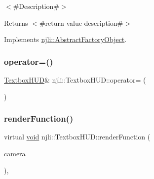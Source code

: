 $<$\#\+Description\#$>$

\begin{DoxyReturn}{Returns}
$<$\#return value description\#$>$ 
\end{DoxyReturn}


Implements \mbox{\hyperlink{classnjli_1_1_abstract_factory_object_a838f4fa7e65cace6098aab5222892942}{njli\+::\+Abstract\+Factory\+Object}}.

\mbox{\label{classnjli_1_1_textbox_h_u_d_a9d253eccffd7f570e70c436ebb823e14}} 
\subsubsection{\texorpdfstring{operator=()}{operator=()}}
{\footnotesize\ttfamily \mbox{\hyperlink{classnjli_1_1_textbox_h_u_d}{Textbox\+H\+UD}}\& njli\+::\+Textbox\+H\+U\+D\+::operator= (\begin{DoxyParamCaption}\item[{const \mbox{\hyperlink{classnjli_1_1_textbox_h_u_d}{Textbox\+H\+UD}} \&}]{ }\end{DoxyParamCaption})\hspace{0.3cm}{\ttfamily [protected]}}

\mbox{\label{classnjli_1_1_textbox_h_u_d_a6daa89a33de35e6cf85b56970447a3a8}} 
\subsubsection{\texorpdfstring{render\+Function()}{renderFunction()}}
{\footnotesize\ttfamily virtual \mbox{\hyperlink{_thread_8h_af1e856da2e658414cb2456cb6f7ebc66}{void}} njli\+::\+Textbox\+H\+U\+D\+::render\+Function (\begin{DoxyParamCaption}\item[{\mbox{\hyperlink{classnjli_1_1_camera}{Camera}} $\ast$}]{camera }\end{DoxyParamCaption})\hspace{0.3cm}{\ttfamily [protected]}, {\ttfamily [virtual]}}



